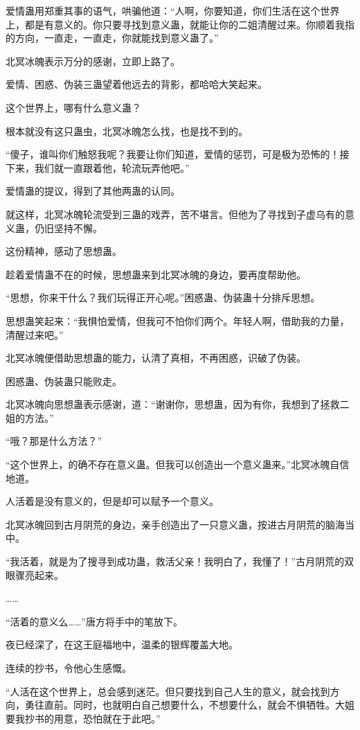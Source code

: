 \begin{this_body}
爱情蛊用郑重其事的语气，哄骗他道：“人啊，你要知道，你们生活在这个世界上，都是有意义的。你只要寻找到意义蛊，就能让你的二姐清醒过来。你顺着我指的方向，一直走，一直走，你就能找到意义蛊了。”

北冥冰魄表示万分的感谢，立即上路了。

爱情、困惑、伪装三蛊望着他远去的背影，都哈哈大笑起来。

这个世界上，哪有什么意义蛊？

根本就没有这只蛊虫，北冥冰魄怎么找，也是找不到的。

“傻子，谁叫你们触怒我呢？我要让你们知道，爱情的惩罚，可是极为恐怖的！接下来，我们就一直跟着他，轮流玩弄他吧。”

爱情蛊的提议，得到了其他两蛊的认同。

就这样，北冥冰魄轮流受到三蛊的戏弄，苦不堪言。但他为了寻找到子虚乌有的意义蛊，仍旧坚持不懈。

这份精神，感动了思想蛊。

趁着爱情蛊不在的时候，思想蛊来到北冥冰魄的身边，要再度帮助他。

“思想，你来干什么？我们玩得正开心呢。”困惑蛊、伪装蛊十分排斥思想。

思想蛊笑起来：“我惧怕爱情，但我可不怕你们两个。年轻人啊，借助我的力量，清醒过来吧。”

北冥冰魄便借助思想蛊的能力，认清了真相，不再困惑，识破了伪装。

困惑蛊、伪装蛊只能败走。

北冥冰魄向思想蛊表示感谢，道：“谢谢你，思想蛊，因为有你，我想到了拯救二姐的方法。”

“哦？那是什么方法？”

“这个世界上，的确不存在意义蛊。但我可以创造出一个意义蛊来。”北冥冰魄自信地道。

人活着是没有意义的，但是却可以赋予一个意义。

北冥冰魄回到古月阴荒的身边，亲手创造出了一只意义蛊，按进古月阴荒的脑海当中。

“我活着，就是为了搜寻到成功蛊，救活父亲！我明白了，我懂了！”古月阴荒的双眼骤亮起来。

……

“活着的意义么……”唐方将手中的笔放下。

夜已经深了，在这王庭福地中，温柔的银辉覆盖大地。

连续的抄书，令他心生感慨。

“人活在这个世界上，总会感到迷茫。但只要找到自己人生的意义，就会找到方向，勇往直前。同时，也就明白自己想要什么，不想要什么，就会不惧牺牲。大姐要我抄书的用意，恐怕就在于此吧。”


\end{this_body}
